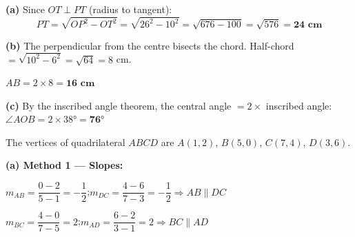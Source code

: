\documentclass[addpoints]{exam}
\begin{document}
\begin{questions}
\begin{solution}[8cm]
\textbf{(a)} Since $OT \perp PT$ (radius to tangent):
\[PT = \sqrt{OP^2 - OT^2} = \sqrt{26^2 - 10^2} = \sqrt{676 - 100} = \sqrt{576} = \mathbf{24 \text{ cm}}\]

\textbf{(b)} The perpendicular from the centre bisects the chord. Half-chord $= \sqrt{10^2 - 6^2} = \sqrt{64} = 8$ cm.

$AB = 2 \times 8 = \mathbf{16 \text{ cm}}$

\textbf{(c)} By the inscribed angle theorem, the central angle $= 2 \times$ inscribed angle:
$\angle AOB = 2 \times \ang{38} = \mathbf{\ang{76}}$
\end{solution}

\question[8] The vertices of quadrilateral $ABCD$ are $A(1, 2)$, $B(5, 0)$, $C(7, 4)$, $D(3, 6)$.
\begin{solution}[11cm]
\textbf{(a) Method 1 — Slopes:}

$m_{AB} = \dfrac{0-2}{5-1} = -\dfrac{1}{2}$;\quad $m_{DC} = \dfrac{4-6}{7-3} = -\dfrac{1}{2}$\quad $\Rightarrow AB \parallel DC$

$m_{BC} = \dfrac{4-0}{7-5} = 2$;\quad $m_{AD} = \dfrac{6-2}{3-1} = 2$\quad $\Rightarrow BC \parallel AD$


\end{solution}
\end{questions}
\end{document}
